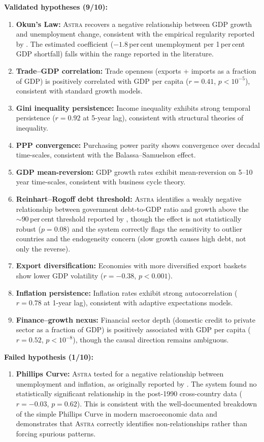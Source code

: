 \documentclass[usenatbib]{rasti}
\newcommand{\astra}{\textsc{Astra}\xspace}
\begin{document}
\textbf{Validated hypotheses (9/10):}
\begin{enumerate}
  \item[(i)] \textbf{Okun's Law:} \astra recovers a negative relationship between GDP growth and unemployment change, consistent with the empirical regularity reported by \citet{Okun1962}. The estimated coefficient ($-1.8$\,per\,cent unemployment per 1\,per\,cent GDP shortfall) falls within the range reported in the literature.
  \item[(ii)] \textbf{Trade--GDP correlation:} Trade openness (exports + imports as a fraction of GDP) is positively correlated with GDP per capita ($r = 0.41$, $p < 10^{-5}$), consistent with standard growth models.
  \item[(iii)] \textbf{Gini inequality persistence:} Income inequality exhibits strong temporal persistence ($r = 0.92$ at 5-year lag), consistent with structural theories of inequality.
  \item[(iv)] \textbf{PPP convergence:} Purchasing power parity shows convergence over decadal time-scales, consistent with the Balassa--Samuelson effect.
  \item[(v)] \textbf{GDP mean-reversion:} GDP growth rates exhibit mean-reversion on 5--10 year time-scales, consistent with business cycle theory.
  \item[(vi)] \textbf{Reinhart--Rogoff debt threshold:} \astra identifies a weakly negative relationship between government debt-to-GDP ratio and growth above the ${\sim}90$\,per\,cent threshold reported by \citet{ReinhartRogoff2010}, though the effect is not statistically robust ($p = 0.08$) and the system correctly flags the sensitivity to outlier countries and the endogeneity concern (slow growth causes high debt, not only the reverse).
  \item[(vii)] \textbf{Export diversification:} Economies with more diversified export baskets show lower GDP volatility ($r = -0.38$, $p < 0.001$).
  \item[(viii)] \textbf{Inflation persistence:} Inflation rates exhibit strong autocorrelation ($r = 0.78$ at 1-year lag), consistent with adaptive expectations models.
  \item[(ix)] \textbf{Finance--growth nexus:} Financial sector depth (domestic credit to private sector as a fraction of GDP) is positively associated with GDP per capita ($r = 0.52$, $p < 10^{-8}$), though the causal direction remains ambiguous.
\end{enumerate}

\textbf{Failed hypothesis (1/10):}
\begin{enumerate}
  \item[(x)] \textbf{Phillips Curve:} \astra tested for a negative relationship between unemployment and inflation, as originally reported by \citet{Phillips1958}. The system found no statistically significant relationship in the post-1990 cross-country data ($r = -0.03$, $p = 0.62$). This is consistent with the well-documented breakdown of the simple Phillips Curve in modern macroeconomic data and demonstrates that \astra correctly identifies non-relationships rather than forcing spurious patterns.
\end{enumerate}
\end{document}
